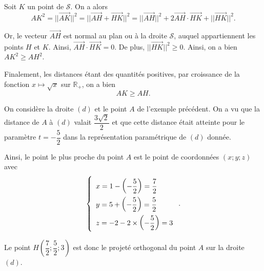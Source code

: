 \documentclass[11pt,fleqn, openany]{book} %
\begin{document}
\begin{demonstration} Soit $K$ un point de $\mathcal{S}$. On a alors\[ AK^2 = \lvert\lvert \overrightarrow{AK}\rvert\rvert^2 = \lvert\lvert\overrightarrow{AH}+\overrightarrow{HK}\rvert\rvert^2 = \lvert\lvert\overrightarrow{AH}\rvert\rvert^2 + 2 \overrightarrow{AH}\cdot \overrightarrow{HK} + \lvert\lvert\overrightarrow{HK}\rvert\rvert^2 .\]

Or, le vecteur $\overrightarrow{AH}$ est normal au plan ou à la droite $\mathcal{S}$, auquel appartiennent les points $H$ et $K$. Ainsi, $\overrightarrow{AH}\cdot \overrightarrow{HK}=0$. De plus, $\lvert\lvert\overrightarrow{HK}\rvert\rvert^2 \geqslant 0$. Ainsi, on a bien $AK^2 \geqslant AH ^2$.

Finalement, les distances étant des quantités positives, par croissance de la fonction $x \mapsto \sqrt{x}$ sur $\mathbb{R}_+$, on a bien
\[ AK \geqslant AH. \]\end{demonstration}

\begin{example}On considère la droite $(d)$ et le point $A$ de l'exemple précédent. On a vu que la distance de $A$ à $(d)$ valait $\dfrac{3\sqrt{2}}{2}$ et que cette distance était atteinte pour le paramètre $t=-\dfrac{5}{2}$ dans la représentation paramétrique de $(d)$ donnée.

Ainsi, le point le plus proche du point $A$ est le point de coordonnées $(x;y;z)$ avec
\[\left\{\renewcommand{\arraystretch}{2} \begin{array}{l}x=1-\left(-\dfrac{5}{2}\right)=\dfrac{7}{2} \\ y=5+\left(-\dfrac{5}{2}\right)=\dfrac{5}{2} \\ z = -2-2 \times \left(-\dfrac{5}{2}\right)=3 \\\end{array}\right. .\]

Le point $H\left(\dfrac{7}{2};\dfrac{5}{2};3\right)$ est donc le projeté orthogonal du point $A$ sur la droite $(d)$.\end{example}
\end{document}
